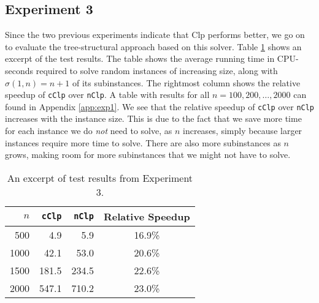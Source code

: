 \subsection*{Experiment 3}
Since the two previous experiments indicate that Clp performs better, we
go on to evaluate the tree-structural approach based on this solver.
Table \ref{table:expfour} shows an excerpt of the test results. The table
shows the average running time in CPU-seconds required to solve random
instances of increasing size, along with $\sigma(1, n) = n + 1$ of its
subinstances.
The rightmost column shows the relative speedup of \texttt{cClp} over
\texttt{nClp}.
A table with results for all $n=100,200,\ldots,2000$ can found in Appendix
\ref{app:exp1}.
We see that the relative speedup of \texttt{cClp} over \texttt{nClp}
increases with the instance size.
This is due to the fact that we save more time for each instance we do
\emph{not} need to solve, as $n$ increases, simply because larger instances
require more time to solve.
There are also more subinstances as $n$ grows, making room for more subinstances
that we might not have to solve.

\begin{table}[ht!]
    \centering
    \caption{An excerpt of test results from Experiment 3.}
    \label{table:expfour}
\begin{tabular}{rrrc}
    $n$ & \texttt{cClp}  & \texttt{nClp}  & Relative Speedup \\ \hline
    500 & 4.9   & 5.9   & 16.9\% \\
   1000 & 42.1  & 53.0  & 20.6\% \\
   1500 & 181.5 & 234.5 & 22.6\% \\
   2000 & 547.1 & 710.2 & 23.0\%
\end{tabular}
\end{table}


